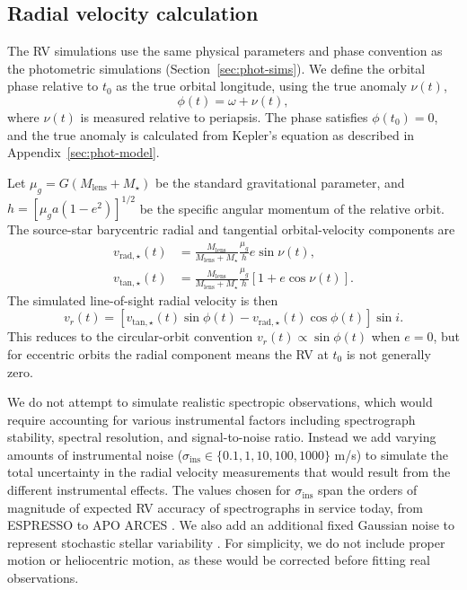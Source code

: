 \documentclass[fleqn,usenatbib]{mnras}
\begin{document}
\subsection{Radial velocity calculation} \label{sec:rv-sims}

The RV simulations use the same physical parameters and phase convention as the photometric simulations (Section~\ref{sec:phot-sims}). We define the orbital phase relative to $t_0$ as the true orbital longitude, using the true anomaly $\nu(t)$,
\begin{equation}
    \phi(t) = \omega + \nu(t),
\end{equation}
where $\nu(t)$ is measured relative to periapsis. The phase satisfies $\phi(t_0)=0$, and the true anomaly is calculated from Kepler's equation as described in Appendix~\ref{sec:phot-model}.

Let $\mu_g=G(M_\mathrm{lens}+M_\star)$ be the standard gravitational parameter, and $h=[\mu_g a(1-e^2)]^{1/2}$ be the specific angular momentum of the relative orbit. The source-star barycentric radial and tangential orbital-velocity components are
\begin{align}
    v_{\mathrm{rad},\star}(t) & =
    \frac{M_\mathrm{lens}}{M_\mathrm{lens}+M_\star}
    \frac{\mu_g}{h}
    e\sin\nu(t),
    \nonumber                     \\
    v_{\mathrm{tan},\star}(t) & =
    \frac{M_\mathrm{lens}}{M_\mathrm{lens}+M_\star}
    \frac{\mu_g}{h}
    \left[1 + e\cos\nu(t)\right].
\end{align}
The simulated line-of-sight radial velocity is then
\begin{equation}
    v_r(t) =
    \left[
        v_{\mathrm{tan},\star}(t)\sin\phi(t)
        -
        v_{\mathrm{rad},\star}(t)\cos\phi(t)
        \right]\sin i.
\end{equation}
This reduces to the circular-orbit convention $v_r(t)\propto\sin\phi(t)$ when $e=0$, but for eccentric orbits the radial component means the RV at $t_0$ is not generally zero.

We do not attempt to simulate realistic spectropic observations, which would require accounting for various instrumental factors including spectrograph stability, spectral resolution, and signal-to-noise ratio. Instead we add varying amounts of instrumental noise ($\sigma_\mathrm{ins} \in \{0.1, 1, 10, 100, 1000\}$ m/s) to simulate the total uncertainty in the radial velocity measurements that would result from the different instrumental effects. The values chosen for $\sigma_\mathrm{ins}$ span the orders of magnitude of expected RV accuracy of spectrographs in service today, from ESPRESSO \citep[][$\sigma_\mathrm{ins} = 0.1$ m/s]{pepe_espresso_2021} to APO ARCES \citep[][$\sigma_\mathrm{ins} = 0.5$ km/s]{gaulme_kic_2022}. We also add an additional fixed Gaussian noise to represent stochastic stellar variability \citep[][$\sigma_\star = 10$ m/s]{wright_radial_2005}. For simplicity, we do not include proper motion or heliocentric motion, as these would be corrected before fitting real observations.
\end{document}
